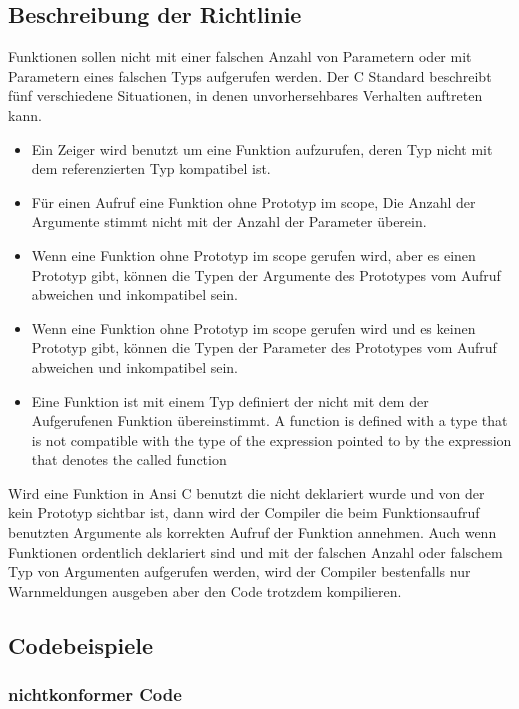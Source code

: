 \documentclass[12pt]{article}
\begin{document}
\subsection{Beschreibung der Richtlinie}
Funktionen sollen nicht mit einer falschen Anzahl von Parametern oder mit Parametern eines falschen Typs aufgerufen werden.
Der C Standard beschreibt fünf verschiedene Situationen, in denen unvorhersehbares Verhalten auftreten kann. 
\begin{itemize}
    \item Ein Zeiger wird benutzt um eine Funktion aufzurufen, deren Typ nicht mit dem referenzierten Typ kompatibel ist.
    \item Für einen Aufruf eine Funktion ohne Prototyp im scope, Die Anzahl der Argumente stimmt nicht mit der Anzahl der Parameter überein.
    \item Wenn eine Funktion ohne Prototyp im scope gerufen wird, aber es einen Prototyp gibt, können die Typen der Argumente des Prototypes vom Aufruf abweichen und inkompatibel sein.
    \item Wenn eine Funktion ohne Prototyp im scope gerufen wird und es keinen Prototyp gibt, können die Typen der Parameter des Prototypes vom Aufruf abweichen und inkompatibel sein.
    \item Eine Funktion ist mit einem Typ definiert der nicht mit dem der Aufgerufenen Funktion übereinstimmt.
    A function is defined with a type that is not compatible with the type of the expression pointed to by the expression that denotes the called function
\end{itemize}

Wird eine Funktion in Ansi C benutzt die nicht deklariert wurde und von der kein Prototyp sichtbar ist, dann wird der Compiler die beim Funktionsaufruf benutzten Argumente als korrekten Aufruf der Funktion annehmen. Auch wenn Funktionen ordentlich deklariert sind und mit der falschen Anzahl oder falschem Typ von Argumenten aufgerufen werden, wird der Compiler bestenfalls nur Warnmeldungen ausgeben aber den Code trotzdem kompilieren.



\newpage
\subsection{Codebeispiele}
\subsubsection{nichtkonformer Code}

\end{document}
